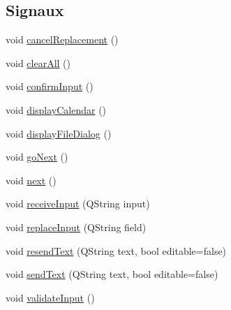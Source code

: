\subsection*{Signaux}
\begin{DoxyCompactItemize}
\item 
void \hyperlink{classSimpleHotel_1_1SH__InOutStateMachine_abd6f8321716ad2f9a5e9d17cdedca275}{cancel\-Replacement} ()
\item 
void \hyperlink{classSimpleHotel_1_1SH__InOutStateMachine_a2b6d60f624ba23c8fc3e52f73e867c86}{clear\-All} ()
\item 
void \hyperlink{classSimpleHotel_1_1SH__InOutStateMachine_a949cdb448f813f201b6ca827d1c860e9}{confirm\-Input} ()
\item 
void \hyperlink{classSimpleHotel_1_1SH__InOutStateMachine_a2801413ae1cf6e87e38e5f5366622860}{display\-Calendar} ()
\item 
void \hyperlink{classSimpleHotel_1_1SH__InOutStateMachine_a034862097f23ae05f9691ae2b45f5d2a}{display\-File\-Dialog} ()
\item 
void \hyperlink{classSimpleHotel_1_1SH__GenericStateMachine_a1c0cc74f8134d2029b0cc8a2a929023d}{go\-Next} ()
\item 
void \hyperlink{classSimpleHotel_1_1SH__GenericStateMachine_a2de14d4920ae8c10b70c2d73fc2d4a93}{next} ()
\item 
void \hyperlink{classSimpleHotel_1_1SH__InOutStateMachine_a17482446bbf0327e84feb5d6a1a612f0}{receive\-Input} (Q\-String input)
\item 
void \hyperlink{classSimpleHotel_1_1SH__InOutStateMachine_a9117d781c5f8bc02d8b2eba359b0e85a}{replace\-Input} (Q\-String field)
\item 
void \hyperlink{classSimpleHotel_1_1SH__InOutStateMachine_a5db6f59d446182ab9f10e0ccb0399915}{resend\-Text} (Q\-String text, bool editable=false)
\item 
void \hyperlink{classSimpleHotel_1_1SH__InOutStateMachine_ae81d4a51fcd3277ebfc11af978b74c0b}{send\-Text} (Q\-String text, bool editable=false)
\item 
void \hyperlink{classSimpleHotel_1_1SH__InOutStateMachine_a3754990c3f90bb7d59e5028d3d6504d8}{validate\-Input} ()
\end{DoxyCompactItemize}

